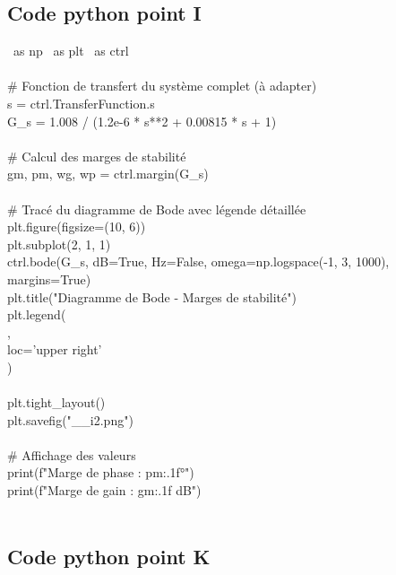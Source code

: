 \documentclass[letterpaper,12pt]{article}
\begin{document}
\subsection{Code python point I}
\ as np
\ as plt
\ as ctrl
\\
\\# Fonction de transfert du système complet (à adapter)
\\s = ctrl.TransferFunction.s
\\G\_s = 1.008 / (1.2e-6 * s**2 + 0.00815 * s + 1)
\\
\\# Calcul des marges de stabilité
\\gm, pm, wg, wp = ctrl.margin(G\_s)
\\
\\# Tracé du diagramme de Bode avec légende détaillée
\\plt.figure(figsize=(10, 6))
\\plt.subplot(2, 1, 1)
\\ctrl.bode(G\_s, dB=True, Hz=False, omega=np.logspace(-1, 3, 1000), margins=True)
\\plt.title("Diagramme de Bode - Marges de stabilité")
\\plt.legend(
\\    [
\\        "Gain (dB)",
\\        "Phase (deg)",
\\        f"Marge de phase: {pm:.1f}°",
\\        f"Marge de gain: {gm:.1f} dB"
\\    ],
\\    loc='upper right'
\\)
\\
\\plt.tight\_layout()
\\plt.savefig("\_\_i2.png")
\\
\\# Affichage des valeurs
\\print(f"Marge de phase : {pm:.1f}°")
\\print(f"Marge de gain : {gm:.1f} dB")
\\
\\\subsection{Code python point K}
\end{document}
